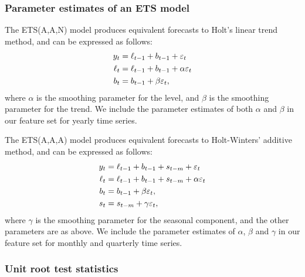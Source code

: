 \documentclass[11pt,a4paper,]{article}
\theoremstyle{definition}
\theoremstyle{definition}
\theoremstyle{definition}
\theoremstyle{remark}
\begin{document}
\hypertarget{parameter-estimates-of-an-ets-model}{%
\subsubsection*{Parameter estimates of an ETS
model}\label{parameter-estimates-of-an-ets-model}}

The ETS(A,A,N) model \autocite{expsmooth08} produces equivalent
forecasts to Holt's linear trend method, and can be expressed as
follows:\vspace*{-.9cm} \begin{align*}
  y_t    & = \ell_{t-1}+b_{t-1}+\varepsilon_t\\
  \ell_t & = \ell_{t-1}+b_{t-1}+\alpha \varepsilon_t\\
  b_t    & = b_{t-1}+\beta \varepsilon_t,\vspace*{-0.99cm}
\end{align*} where \(\alpha\) is the smoothing parameter for the level,
and \(\beta\) is the smoothing parameter for the trend. We include the
parameter estimates of both \(\alpha\) and \(\beta\) in our feature set
for yearly time series.

The ETS(A,A,A) model \autocite{expsmooth08} produces equivalent
forecasts to Holt-Winters' additive method, and can be expressed as
follows:\vspace*{-.9cm} \begin{align*}
  y_t    & = \ell_{t-1}+b_{t-1}+s_{t-m}+\varepsilon_t\\
  \ell_t & = \ell_{t-1}+b_{t-1}+s_{t-m}+\alpha \varepsilon_t\\
  b_t    & = b_{t-1}+\beta \varepsilon_t,\\
  s_t &= s_{t-m} + \gamma\varepsilon_t,\vspace*{-0.99cm}
\end{align*} where \(\gamma\) is the smoothing parameter for the
seasonal component, and the other parameters are as above. We include
the parameter estimates of \(\alpha\), \(\beta\) and \(\gamma\) in our
feature set for monthly and quarterly time series.

\hypertarget{unit-root-test-statistics}{%
\subsubsection*{Unit root test
statistics}\label{unit-root-test-statistics}}
\end{document}

